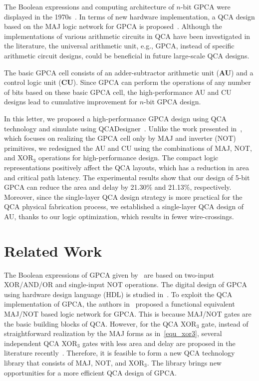 \documentclass[9pt,journal,compsoc]{IEEEtran}
\begin{document}
The Boolean expressions and computing architecture of $n$-bit GPCA were displayed in the 1970s~\cite{4}.
In terms of new hardware implementation, a QCA design based on the MAJ logic network for GPCA is proposed~\cite{2}.
Although the implementations of various arithmetic circuits in QCA have been investigated in the literature, 
the universal arithmetic unit, e.g., GPCA, instead of specific arithmetic circuit designs, could be beneficial in future large-scale QCA designs.  

The basic GPCA cell consists of an adder-subtractor arithmetic unit (\textbf{AU}) and a control logic unit (\textbf{CU}). 
Since GPCA can perform the operations of any number of bits based on these basic GPCA cell, the high-performance AU and CU designs lead to cumulative improvement for $n$-bit GPCA design. 

In this letter, we proposed a high-performance GPCA design using QCA technology and simulate using QCADesigner~\cite{QCAdesigner}.
Unlike the work presented in~\cite{2}, which focuses on realizing the GPCA cell only by MAJ and inverter (NOT) primitives, we redesigned the AU and CU using the combinations of MAJ, NOT, and XOR$_3$ operations for high-performance design. 
The compact logic representations positively affect the QCA layouts, which has a reduction in area and critical path latency.
The experimental results show that our design of 5-bit GPCA can reduce the area and delay by 21.30\% and 21.13\%, respectively. Moreover, since the single-layer QCA design strategy is more practical for the QCA physical fabrication process, we established a single-layer QCA design of AU, thanks to our logic optimization, which results in fewer wire-crossings.


\vspace{-3ex}
\section{Related Work}\vspace{-1ex}
The Boolean expressions of GPCA given by~\cite{4} are based on two-input XOR/AND/OR and single-input NOT operations.
The digital design of GPCA using hardware design language (HDL) is studied in~\cite{singh2014simulation}.
To exploit the QCA implementation of GPCA, the authors in~\cite{2} proposed a functional equivalent MAJ/NOT based logic network for GPCA. This is because MAJ/NOT gates are the basic building blocks of QCA. 
However, for the QCA XOR$_3$ gate, instead of straightforward realization by the MAJ forms as in~\eqref{equ_xor3}, several independent QCA XOR$_3$ gates with less area and delay are proposed in the literature recently~\cite{3,roshany2019novel}.    
Therefore, it is feasible to form a new QCA technology library that consists of MAJ, NOT, and XOR$_3$.
The library brings new opportunities for a more efficient QCA design of GPCA. 
\end{document}
